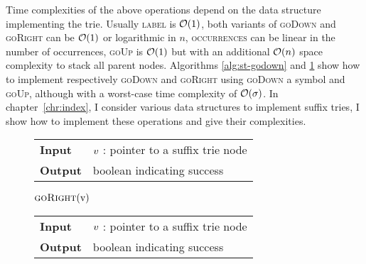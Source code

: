 Time complexities of the above operations depend on the data structure implementing the trie.
Usually \textsc{label} is $\mathcal{O}(1)$, both variants of \textsc{goDown} and \textsc{goRight} can be $\mathcal{O}(1)$ or logarithmic in $n$, \textsc{occurrences} can be linear in the number of occurrences, \textsc{goUp} is $\mathcal{O}(1)$ but with an additional $\mathcal{O}(n)$ space complexity to stack all parent nodes.
Algorithms \ref{alg:st-godown} and \ref{alg:st-goright} show how to implement respectively \textsc{goDown} and \textsc{goRight} using \textsc{goDown} a symbol and \textsc{goUp}, although with a worst-case time complexity of $\mathcal{O}(\sigma)$.
In chapter~\ref{chr:index}, I consider various data structures to implement suffix tries, I show how to implement these operations and give their complexities.

\begin{figure*}[t]
\begin{minipage}[t]{.5\textwidth}
\begin{algorithm}[H]
\begin{tabular}{ll}
\textbf{Input}  & $v$ : pointer to a suffix trie node\\
\textbf{Output} & boolean indicating success\\
\end{tabular}
\begin{algorithmic}[1]
	\State \Return \False
\EndIf
{}
	\State \Return \True
\Else
	\State \Return $\Call{goRight}{$\StrieNode$}$		
\EndIf
\end{algorithmic}
\label{alg:st-godown}
\end{algorithm}
\end{minipage}
\hfill
\begin{minipage}[t]{.5\textwidth}
\begin{algorithm}[H]
\begin{tabular}{ll}
\textbf{Input}  & $v$ : pointer to a suffix trie node\\
\textbf{Output} & boolean indicating success\\
\end{tabular}
\begin{algorithmic}[1]
			\State \Return \True
		\EndIf
	\EndWhile
\EndIf
\State \Return \False $\phantom{()}$
\end{algorithmic}
\label{alg:st-goright}
\end{algorithm}
\end{minipage}
\end{figure*}


